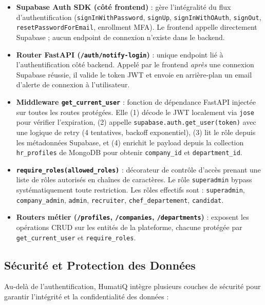 \begin{itemize}
    \item \textbf{Supabase Auth SDK (côté frontend)} : gère l'intégralité du flux d'authentification (\texttt{signInWithPassword}, \texttt{signUp}, \texttt{signInWithOAuth}, \texttt{signOut}, \texttt{resetPasswordForEmail}, enrollment MFA). Le frontend appelle directement Supabase ; aucun endpoint de connexion n'existe dans le backend.

    \item \textbf{Router FastAPI (\texttt{/auth/notify-login})} : unique endpoint lié à l'authentification côté backend. Appelé par le frontend \emph{après} une connexion Supabase réussie, il valide le token JWT et envoie en arrière-plan un email d'alerte de connexion à l'utilisateur.

    \item \textbf{Middleware \texttt{get\_current\_user}} : fonction de dépendance FastAPI injectée sur toutes les routes protégées. Elle (1) décode le JWT localement via \texttt{jose} pour vérifier l'expiration, (2) appelle \texttt{supabase.auth.get\_user(token)} avec une logique de retry (4 tentatives, backoff exponentiel), (3) lit le rôle depuis les métadonnées Supabase, et (4) enrichit le payload depuis la collection \texttt{hr\_profiles} de MongoDB pour obtenir \texttt{company\_id} et \texttt{department\_id}.

    \item \textbf{\texttt{require\_roles(allowed\_roles)}} : décorateur de contrôle d'accès prenant une liste de rôles autorisés en chaînes de caractères. Le rôle \texttt{superadmin} bypass systématiquement toute restriction. Les rôles effectifs sont : \texttt{superadmin}, \texttt{company\_admin}, \texttt{admin}, \texttt{recruiter}, \texttt{chef\_departement}, \texttt{candidat}.

    \item \textbf{Routers métier (\texttt{/profiles}, \texttt{/companies}, \texttt{/departments})} : exposent les opérations CRUD sur les entités de la plateforme, chacune protégée par \texttt{get\_current\_user} et \texttt{require\_roles}.
\end{itemize}

\subsection{Sécurité et Protection des Données}
Au-delà de l'authentification, HumatiQ intègre plusieurs couches de sécurité pour garantir l'intégrité et la confidentialité des données :

